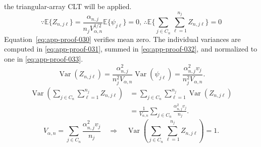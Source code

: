 \documentclass[11pt]{article}
\numberwithin{equation}{section}
\DeclareMathOperator{\Var}{Var}
\newcommand{\E}{\mathbb E}
\newcommand{\1}{\mathbf 1}
\begin{document}
the triangular-array CLT will be applied.
\begin{equation}
\label{eq:app-proof-030}
\because\E\{Z_{n,j\ell}\}=\frac{\alpha_{n,j}}{n_jV_{\alpha,n}^{1/2}}\E\{\psi_{j\ell}\}=0,\,\therefore\E\{\sum_{j\in C_n}\sum_{\ell=1}^{n_j}Z_{n,j\ell}\}=0
\end{equation}
Equation~\eqref{eq:app-proof-030} verifies mean zero.  The individual
variances are computed in \eqref{eq:app-proof-031}, summed in
\eqref{eq:app-proof-032}, and normalized to one in
\eqref{eq:app-proof-033}.
\begin{equation}
\label{eq:app-proof-031}
\Var(Z_{n,j\ell})
=\frac{\alpha_{n,j}^2}{n_j^2V_{\alpha,n}}
\Var(\psi_{j\ell})
=\frac{\alpha_{n,j}^2v_j}{n_j^2V_{\alpha,n}}.
\end{equation}
\begin{equation}
\label{eq:app-proof-032}
\begin{aligned}
\Var\!\left(\sum_{j\in C_n}\sum_{\ell=1}^{n_j}Z_{n,j\ell}\right)
&=\sum_{j\in C_n}\sum_{\ell=1}^{n_j}\Var(Z_{n,j\ell})\\
&=\frac{1}{V_{\alpha,n}}
\sum_{j\in C_n}\frac{\alpha_{n,j}^2v_j}{n_j}.
\end{aligned}
\end{equation}
\begin{equation}
\label{eq:app-proof-033}
V_{\alpha,n}
=\sum_{j\in C_n}\frac{\alpha_{n,j}^2v_j}{n_j}
\quad\Longrightarrow\quad
\Var\!\left(\sum_{j\in C_n}\sum_{\ell=1}^{n_j}Z_{n,j\ell}\right)=1.
\end{equation}
\end{document}
